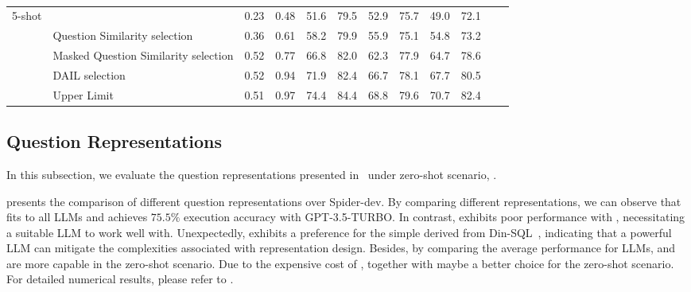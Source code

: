 \begin{table*}[th]
\begin{tabular}{llcccccccccc}
		\multirow{5}{*}{5-shot}	&	\abrandselector	& 0.23  & 0.48  & 51.6  & 79.5  & 52.9  & 75.7  & 49.0  & 72.1			& \revision{-}	& \revision{-}   \\
		&	Question Similarity selection	& 0.36  & 0.61 & 58.2  & 79.9  & 55.9  & 75.1  & 54.8  & 73.2				& \revision{-}	& \revision{-}   \\
		&	Masked Question Similarity selection	& 0.52 & 0.77 & 66.8  & 82.0  & 62.3  & 77.9  & 64.7  & 78.6				& \revision{-}	& \revision{-}   \\
		&	DAIL selection	& 0.52 & 0.94 & 71.9 & 82.4  & 66.7  & 78.1  & 67.7  & 80.5				& \revision{-}	& \revision{-}   \\
            &	Upper Limit	& 0.51 & 0.97 & 74.4  & 84.4  & 68.8  & 79.6  & 70.7  & 82.4			& \revision{-}	& \revision{-}   \\%
		\bottomrule
	\end{tabular}
        \caption{}
	\label{tab:kk_prompt_spider}
\end{table*}

\subsection{Question Representations}
In this subsection, we evaluate the question representations presented in~ under zero-shot scenario,  .

 presents the comparison of different question representations over Spider-dev. 
By comparing different representations, we can observe that \abopenaiprompt fits to all  LLMs and achieves $75.5\%$ execution accuracy with GPT-3.5-TURBO. 
In contrast, \abalpacaprompt exhibits poor performance with , necessitating a suitable LLM to work well with.
Unexpectedly, \gptfour exhibits a preference for the simple \abbsprompt derived from Din-SQL~\cite{din-sql}, indicating that a powerful LLM can mitigate the complexities associated with representation design.
Besides, by comparing the average performance for  LLMs, \gptfour and \chatgpt are more capable in the zero-shot scenario. 
Due to the expensive cost of \gptfour, \chatgpt together with \abopenaiprompt maybe a better choice for the zero-shot scenario. 
For detailed numerical results, please refer to . 

